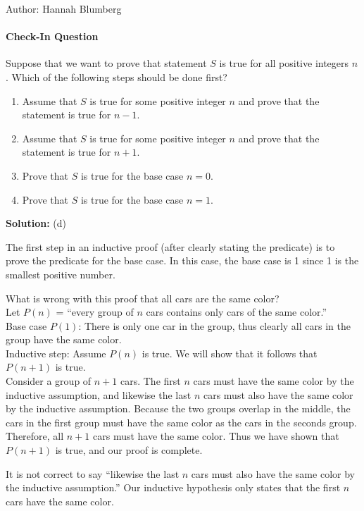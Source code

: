\documentclass[solution, letterpaper]{cs20inclass}
\begin{document}

\noindent Author: Hannah Blumberg%

\paragraph*{Check-In Question}
Suppose that we want to prove that statement $S$ is true for all positive integers $n$. Which of the following steps should be done first?
\begin{enumerate}
\item	Assume that $S$ is true for some positive integer $n$ and prove that the statement is true for $n-1$.
\item	Assume that $S$ is true for some positive integer $n$ and prove that the statement is true for $n+1$.
\item	Prove that $S$ is true for the base case $n = 0$.
\item	Prove that $S$ is true for the base case $n = 1$.
\end{enumerate}

\textbf{Solution:} (d)

The first step in an inductive proof (after clearly stating the predicate) is to prove the predicate for the base case. In this case, the base case is 1 since 1 is the smallest positive number.

\problem

What is wrong with this proof that all cars are the same color?\\

Let $P(n)$ = ``every group of $n$ cars contains only cars of the same color.''\\
Base case $P(1)$: There is only one car in the group, thus clearly all cars in the group have the same color. \\
Inductive step: Assume $P(n)$ is true. We will show that it follows that $P(n+1)$ is true. \\  
Consider a group of $n+1$ cars. The first $n$ cars must have the same color by the inductive assumption, and likewise the last $n$ cars must also have the same color by the inductive assumption. Because the two groups overlap in the middle, the cars in the first group must have the same color as the cars in the seconds group. Therefore, all $n+1$ cars must have the same color. Thus we have shown that $P(n+1)$ is true, and our proof is complete.

\begin{solution}

It is not correct to say ``likewise the last $n$ cars must also have the same color by the inductive assumption.'' Our inductive hypothesis only states that the first $n$ cars have the same color.
  
\end{solution}
\end{document}
